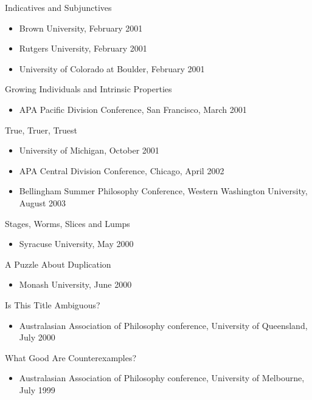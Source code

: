 \documentclass[
  10pt,
  letterpaper,
  DIV=11,
  numbers=noendperiod,
  twoside]{scrartcl}
\providecommand{\tightlist}{%
  \setlength{\itemsep}{0pt}\setlength{\parskip}{0pt}}\usepackage{longtable,booktabs,array}
\begin{document}
Indicatives and Subjunctives

\begin{itemize}
\tightlist
\item
  Brown University, February 2001
\item
  Rutgers University, February 2001
\item
  University of Colorado at Boulder, February 2001
\end{itemize}

Growing Individuals and Intrinsic Properties

\begin{itemize}
\tightlist
\item
  APA Pacific Division Conference, San Francisco, March 2001
\end{itemize}

True, Truer, Truest

\begin{itemize}
\tightlist
\item
  University of Michigan, October 2001
\item
  APA Central Division Conference, Chicago, April 2002
\item
  Bellingham Summer Philosophy Conference, Western Washington
  University, August 2003
\end{itemize}

Stages, Worms, Slices and Lumps

\begin{itemize}
\tightlist
\item
  Syracuse University, May 2000
\end{itemize}

A Puzzle About Duplication

\begin{itemize}
\tightlist
\item
  Monash University, June 2000
\end{itemize}

Is This Title Ambiguous?

\begin{itemize}
\tightlist
\item
  Australasian Association of Philosophy conference, University of
  Queensland, July 2000
\end{itemize}

What Good Are Counterexamples?

\begin{itemize}
\tightlist
\item
  Australasian Association of Philosophy conference, University of
  Melbourne, July 1999
\end{itemize}
\end{document}
